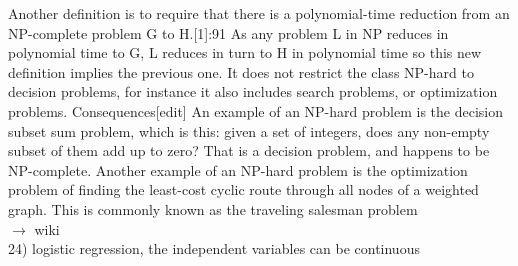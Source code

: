 \documentclass[12pt]{article}
\theoremstyle{plain}
\begin{document}
Another definition is to require that there is a polynomial-time reduction from an NP-complete problem G to H.[1]:91 As any problem L in NP reduces in polynomial time to G, L reduces in turn to H in polynomial time so this new definition implies the previous one. It does not restrict the class NP-hard to decision problems, for instance it also includes search problems, or optimization problems.
Consequences[edit]
An example of an NP-hard problem is the decision subset sum problem, which is this: given a set of integers, does any non-empty subset of them add up to zero? That is a decision problem, and happens to be NP-complete. Another example of an NP-hard problem is the optimization problem of finding the least-cost cyclic route through all nodes of a weighted graph. This is commonly known as the traveling salesman problem\\
$\longrightarrow$ wiki\\
24) logistic regression, the independent variables can be continuous
\end{document}
